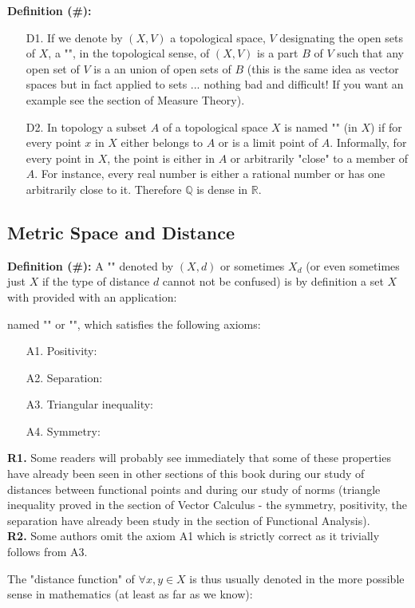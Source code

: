 	\textbf{Definition (\#\mydef):} 
	\begin{enumerate}
		\item[D1.] If we denote by $(X, V)$ a topological space, $V$ designating the open sets of $X$, a "", in the topological sense, of $(X, V)$ is a part $B$ of $V$ such that any open set of $V$ is a an union of open sets of $B$ (this is the same idea as vector spaces but in fact applied to sets ... nothing bad and difficult! If you want an example see the section of Measure Theory).
		
		\item[D2.] In topology a subset $A$ of a topological space $X$ is named "\label{dense set}" (in $X$) if for every point $x$ in $X$ either belongs to $A$ or is a limit point of $A$. Informally, for every point in $X$, the point is either in $A$ or arbitrarily "close" to a member of $A$. For instance, every real number is either a rational number or has one arbitrarily close to it. Therefore $\mathbb{Q}$ is dense in $\mathbb{R}$.
	\end{enumerate}
	
	\pagebreak
	\subsection{Metric Space and Distance}\label{distance}
	\textbf{Definition (\#\mydef):} A "" denoted by $(X, d)$ or sometimes $X_d$ (or even sometimes just $X$ if the type of distance $d$ cannot not be confused) is by definition a set $X$ with provided with an application:
	
	named "" or "", which satisfies the following axioms:
	\begin{itemize}
		\item[A1.] Positivity:
		
		
		\item[A2.] Separation:
		
		\item[A3.] Triangular inequality:
		
		
		\item[A4.] Symmetry: 
		
	\end{itemize}
	\begin{tcolorbox}[title=Remarks,colframe=black,arc=10pt]
		\textbf{R1.} Some readers will probably see immediately that some of these properties have already been seen in other sections of this book during our study of distances between functional points and during our study of norms (triangle inequality proved in the section of Vector Calculus - the symmetry, positivity, the separation have already been study in the section of Functional Analysis).\\
		
		\textbf{R2.} Some authors omit the axiom A1 which is strictly correct as it trivially follows from A3.\\
	\end{tcolorbox}
	The "distance function" of $\forall x,y \in X$ is thus usually denoted in the more possible sense in mathematics (at least as far as we know):
	
